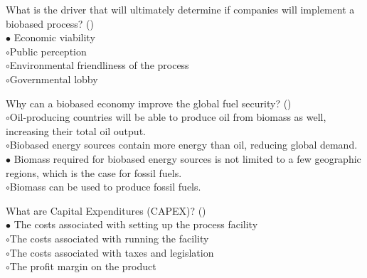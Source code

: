 \documentclass[]{beamer}
\begin{document}
\begin{CJK}{UTF8}{gbsn}
\begin{frame}[shrink] {} 
\addtocounter{questions}{1}
\color{blue}
  What is the driver that will ultimately determine if companies will implement a biobased process?
 ({})\\
\color{black}
\setlength{\parindent}{-0.4cm}
{\color{red}$\bullet$} Economic viability   \\
{\color{red}$\circ$}Public perception  \\
{\color{red}$\circ$}Environmental friendliness of the process   \\
{\color{red}$\circ$}Governmental lobby  \\
\end{frame}


\begin{frame}[shrink] {} 
\addtocounter{questions}{1}
\color{blue}
  Why can a biobased economy improve the global fuel security?
 ({})\\
\color{black}
\setlength{\parindent}{-0.4cm}
{\color{red}$\circ$}Oil-producing countries will be able to produce oil from biomass as well, increasing their total oil output.  \\
{\color{red}$\circ$}Biobased energy sources contain more energy than oil, reducing global demand.  \\
{\color{red}$\bullet$} Biomass required for biobased energy sources is not limited to a few geographic regions, which is the case for fossil fuels.  \\
{\color{red}$\circ$}Biomass can be used to produce fossil fuels.   \\
\end{frame}


\begin{frame}[shrink] {} 
\addtocounter{questions}{1}
\color{blue}
  What are Capital Expenditures (CAPEX)?
 ({})\\
\color{black}
\setlength{\parindent}{-0.4cm}
{\color{red}$\bullet$} The costs associated with setting up the process facility  \\
{\color{red}$\circ$}The costs associated with running the facility  \\
{\color{red}$\circ$}The costs associated with taxes and legislation  \\
{\color{red}$\circ$}The profit margin on the product  \\
\end{frame}



\end{CJK}
\end{document}
